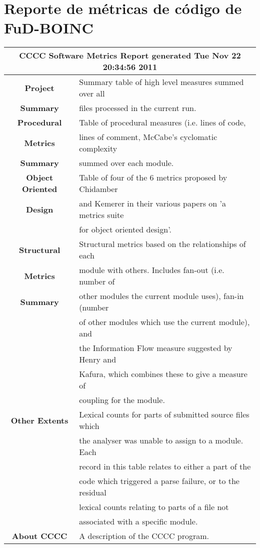 \chapter{Reporte de métricas de código de FuD-BOINC}
\label{chapter:FuD-BOINC:metrics_report}

\begin{tabular}{|c|l|}
\hline
\multicolumn{2}{|c|}{CCCC Software Metrics Report generated Tue Nov 22 20:34:56 2011} \\
 \hline 
 \textbf{Project}       & Summary table of high level measures summed over all\\
 \textbf{Summary}       & files processed in the current run.  \\
 \hline 
 \textbf{Procedural}    & Table of procedural measures (i.e. lines of code, \\
 \textbf{Metrics}       & lines of comment, McCabe's cyclomatic complexity \\
 \textbf{Summary}       & summed over each module.  \\
 \hline 
 \textbf{Object Oriented} & Table of four of the 6 metrics proposed by Chidamber \\
 \textbf{Design}        & and Kemerer in their various papers on 'a metrics suite \\
                        & for object oriented design'. \\
 \hline 
 \textbf{Structural}    & Structural metrics based on the relationships of each \\
 \textbf{Metrics}       & module with others. Includes fan-out (i.e. number of \\
 \textbf{Summary}       & other modules the current module uses), fan-in (number \\
                        & of other modules which use the current module), and \\
                        & the Information Flow measure suggested by Henry and \\
                        & Kafura, which combines these to give a measure of \\
                        & coupling for the module. \\
 \hline 
 \textbf{Other Extents} & Lexical counts for parts of submitted source files which \\
                        & the analyser was unable to assign to a module. Each \\
                        & record in this table relates to either a part of the \\
                        & code which triggered a parse failure, or to the residual \\
                        & lexical counts relating to parts of a file not \\
                        & associated with a specific module. \\
 \hline 
 \textbf{About CCCC}    & A description of the CCCC program.  \\
 \hline 
\end{tabular}
\newpage

